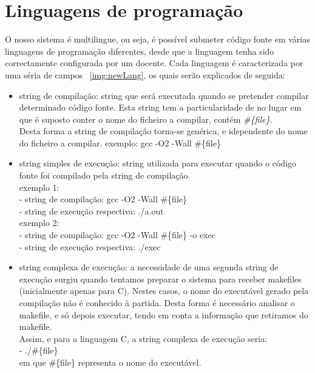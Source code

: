 \section{Linguagens de programação}\label{sec lps}
O nosso sistema é multilingue, ou seja, é possível submeter código fonte em várias linguagens de programação diferentes, desde que 
a linguagem tenha sido correctamente configurada por um docente.
Cada linguagem é caracterizada por uma séria de campos ~\ref{img:newLang}, os quais serão explicados de seguida:
\begin{itemize}
\item string de compilação: string que será executada quando se pretender compilar determinado código fonte. Esta string tem a
particularidade de no lugar em que é suposto conter o nome do ficheiro a compilar, contém \textit{\#\{file\}}.\\
Desta forma a string de compilação torna-se genérica, e idependente do nome do ficheiro a compilar.
exemplo: gcc -O2 -Wall \#\{file\}

\item string simples de execução: string utilizada para executar quando o código fonte foi compilado pela string de compilação.\\
exemplo 1:\\ 
- string de compilação: gcc -O2 -Wall \#\{file\}\\
- string de execução respectiva: ./a.out\\
exemplo 2:\\
- string de compilação: gcc -O2 -Wall \#\{file\} -o exec\\
- string de execução respectiva: ./exec\\

\item string complexa de execução: a necessidade de uma segunda string de execução surgiu quando tentamos preparar o sistema para receber makefiles (inicialmente apenas para C). Nestes casos, o nome do executável gerado pela compilação não é conhecido à partida.
Desta forma é necessário analisar o makefile, e só depois executar, tendo em conta a informação que retiramos do makefile.\\
Assim, e para a linguagem C, a string complexa de execução seria:\\
- ./\#\{file\}\\
em que \#\{file\} representa o nome do executável.


\end{itemize}

